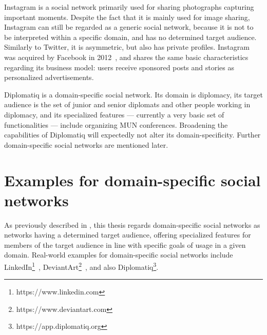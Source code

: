 Instagram is a social network primarily used for sharing photographs capturing important moments. Despite the fact that it is mainly used for image sharing, Instagram can still be regarded as a generic social network, because it is not to be interpreted within a specific domain, and has no determined target audience. Similarly to Twitter, it is asymmetric, but also has private profiles. Instagram was acquired by Facebook in 2012~\cite{facebookacquiresinstagram}, and shares the same basic characteristics regarding its business model: users receive sponsored posts and stories as personalized advertisements.

Diplomatiq is a domain-specific social network. Its domain is diplomacy, its target audience is the set of junior and senior diplomats and other people working in diplomacy, and its specialized features — currently a very basic set of functionalities — include organizing MUN conferences. Broadening the capabilities of Diplomatiq will expectedly not alter its domain-specificity. Further domain-specific social networks are mentioned later.

\section{Examples for domain-specific social networks}

As previously described in , this thesis regards domain-specific social networks as networks having a determined target audience, offering specialized features for members of the target audience in line with specific goals of usage in a given domain. Real-world examples for domain-specific social networks include LinkedIn\footnote{https://www.linkedin.com}~\cite{about-linkedin}, DeviantArt\footnote{https://www.deviantart.com}~\cite{about-deviantart}, and also Diplomatiq\footnote{https://app.diplomatiq.org}.

